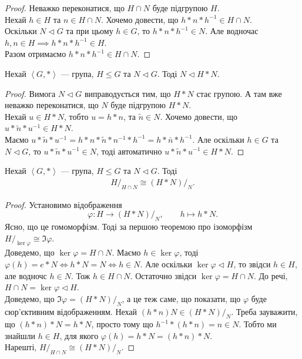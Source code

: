 \documentclass{math_library}
\begin{document}
\begin{proof}
Неважко переконатися, що $H \cap N$ буде підгрупою $H$.\\
Нехай $h \in H$ та $n \in H \cap N$. Хочемо довести, що $h * n * h^{-1} \in H \cap N$.\\
Оскільки $N \triangleleft G$ та при цьому $h \in G$, то $h*n*h^{-1} \in N$. Але водночас $h,n \in H \implies h*n*h^{-1} \in H$.\\
Разом отримаємо $h*n*h^{-1} \in H \cap N$.
\end{proof}
\fi

\begin{lemma}
Нехай $\left< G, * \right>$ --- група, $H \leq G$ та $N \triangleleft G$. Тоді $N \triangleleft H * N$.
\end{lemma}

\begin{proof}
Вимога $N \triangleleft G$ виправодується тим, що $H*N$ стає групою. А там вже неважко переконатися, що $N$ буде підгрупою $H*N$.\\
Нехай $u \in H*N$, тобто $u = h*n$, та $\tilde{n} \in N$. Хочемо довести, що $u*\tilde{n}*u^{-1} \in H*N$.\\
Маємо $u*\tilde{n}*u^{-1} = h*n*\tilde{n}*n^{-1}*h^{-1} = h*\bar{n}*h^{-1}$. Але оскільки $h \in G$ та $N \triangleleft G$, то $u*\tilde{n}*u^{-1} \in N$, тоді автоматично $u*\tilde{n}*u^{-1} \in H*N$.
\end{proof}

\begin{theorem}
Нехай $\left< G, * \right>$ --- група, $H \leq G$ та $N \triangleleft G$. Тоді
\begin{align*}
H/_{H \cap N} \cong (H*N)/_{N}.
\end{align*}
\end{theorem}

\begin{proof}
Установимо відображення 
\[
\varphi \colon H \to (H*N)/_N, \qquad h\mapsto h*N.
\] 
Ясно, що це гомоморфізм. Тоді за першою теоремою про ізоморфізм $H/_{\ker \varphi} \cong \Im \varphi$.\\
Доведемо, що $\ker \varphi = H \cap N$. Маємо $h \in \ker \varphi$, тоді $\varphi(h) = e*N \iff h*N = N \iff h \in N$. Але оскільки $\ker \varphi \triangleleft H$, то звідси $h \in H$, але водночс $h \in N$. Тож $h \in H \cap N$. Остаточно звідси $\ker \varphi = H \cap N$. До речі, $H \cap N = \ker \varphi \triangleleft H$.\\
Доведемо, що $\Im \varphi = (H*N)/_N$, а це теж саме, що показати, що $\varphi$ буде сюр'єктивним відображенням. Нехай $(h*n)N \in (H*N)/_N$. Треба зауважити, що $(h*n)*N = h*N$, просто тому що $h^{-1}*(h*n) = n \in N$. Тобто ми знайшли $h \in H$, для якого $\varphi(h) =h*N = (h*n)*N$.\\
Нарешті, $H/_{H \cap N} \cong (H*N)/_N$.
\end{proof}
\end{document}
